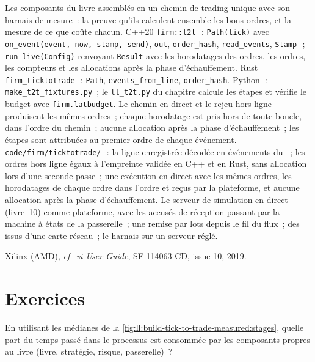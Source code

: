 \begin{build}
 Les composants du livre assemblés en un chemin de trading unique avec son harnais de mesure~: la preuve qu'ils calculent
ensemble les bons ordres, et la mesure de ce que coûte chacun.
 C++20 \texttt{firm::t2t}\,~: \texttt{Path(tick)} avec \texttt{on\_event(event, now, stamp, send)}, \texttt{out},
\texttt{order\_hash}, \texttt{read\_events}, \texttt{Stamp}\,~; \texttt{run\_live(Config)} renvoyant \texttt{Result} avec les
horodatages des ordres, les ordres, les compteurs et les allocations après la phase d'échauffement. Rust \texttt{firm\_ticktotrade}\,~: \texttt{Path},
\texttt{events\_from\_line}, \texttt{order\_hash}. Python\,~: \texttt{make\_t2t\_fixtures.py}~; le \texttt{ll\_t2t.py} du chapitre
calcule les étapes et vérifie le budget avec \texttt{firm.latbudget}.
 Le chemin en direct et le rejeu hors ligne produisent les mêmes ordres~; chaque horodatage est pris hors de toute boucle, dans l'ordre du chemin~;
aucune allocation après la phase d'échauffement~; les étapes sont attribuées au premier ordre de chaque événement.
 \texttt{code/firm/ticktotrade/}\,~: la ligne enregistrée décodée en événements du ~; les ordres
hors ligne égaux à l'empreinte validée en C++ et en Rust, sans allocation lors d'une seconde passe~; une exécution en direct avec les mêmes ordres,
les horodatages de chaque ordre dans l'ordre et reçus par la plateforme, et aucune allocation après la phase d'échauffement.
 Le serveur de simulation en direct (livre~10) comme plateforme, avec les accusés de réception passant par la machine à états de la passerelle~;
une remise par lots depuis le fil du flux~; des  issus d'une carte réseau~; le harnais sur un serveur réglé.
\end{build}

\begin{omsources}
\item Xilinx (AMD), \emph{ef\_vi User Guide}, SF-114063-CD, issue 10, 2019.
\end{omsources}

\section{Exercices}

\begin{exercise}[$\star$]\label{exo:ll:build-tick-to-trade-measured:1}
En utilisant les médianes de la \cref{fig:ll:build-tick-to-trade-measured:stages}, quelle part du temps passé dans le processus est
consommée par les composants propres au livre (livre, stratégie, risque, passerelle)~?
\end{exercise}

